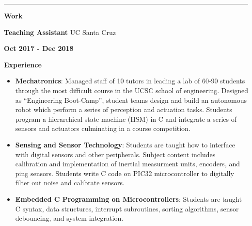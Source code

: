 \documentclass[paper=a4,fontsize=11pt]{article} %
\def \sectionSpace   {0.009\textheight} %
\def \subSectionSpace{0.003\textheight} %
\def \leftColSpace      {0.1\textwidth} %
\def \middleColSpace    {0.75\textwidth}%
\def \bigMiddleColSpace {0.8\textwidth} %
\def \rightColSpace {0.25\textwidth}    %
\def \lineThickness {1pt}               %
\begin{document}
    \vspace{\sectionSpace}
    \noindent\rule{\textwidth}{\lineThickness}

    \noindent
    \begin{minipage}[t]{\leftColSpace}
        \noindent \textbf{Work}
    \end{minipage}
    \begin{minipage}[t]{\middleColSpace}
        \noindent \textbf{Teaching Assistant} \quad UC Santa Cruz
    \end{minipage}
    \begin{minipage}[t]{\rightColSpace}
        \noindent \textbf{Oct 2017 - Dec 2018}
    \end{minipage}

    \noindent
    \begin{minipage}[t]{\leftColSpace}
        \noindent \textbf{Experience}
    \end{minipage}
    \begin{minipage}[t]{\bigMiddleColSpace}
        \begin{itemize}[noitemsep,topsep=0pt]\setlength{\parskip}{\subSectionSpace}
            \item \textbf{Mechatronics}: Managed staff of 10 tutors in leading a lab of 60-90 students through the most difficult course in the UCSC school of engineering. Designed as “Engineering Boot-Camp”, student teams design and build an autonomous robot which perform a series of perception and actuation tasks. Students program a hierarchical state machine (HSM) in C and integrate a series of sensors and actuators culminating in a course competition.
            \item \textbf{Sensing and Sensor Technology}: Students are taught how to interface with digital sensors and other peripherals. Subject content includes calibration and implementation of inertial measurment units, encoders, and ping sensors. Students write C code on PIC32 microcontroller to digitally filter out noise and calibrate sensors.
            \item \textbf{Embedded C Programming on Microcontrollers}: Students are taught C syntax, data structures, interrupt subroutines, sorting algorithms, sensor debouncing, and system integration.
        \end{itemize}
    \end{minipage}
\end{document}
